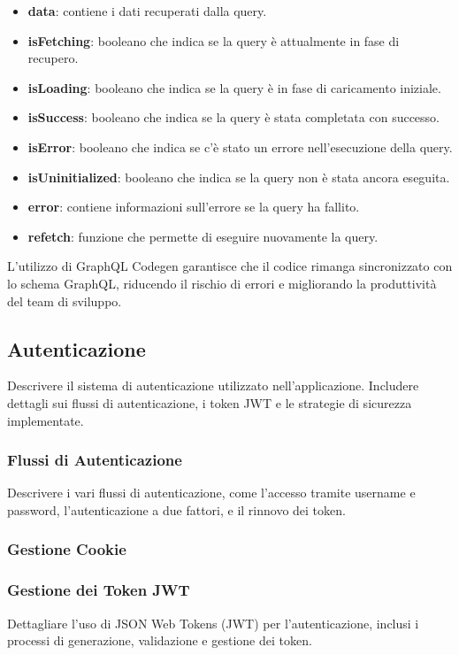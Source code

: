 \begin{itemize}
  \item \textbf{data}: contiene i dati recuperati dalla query.
  \item \textbf{isFetching}: booleano che indica se la query è attualmente in fase di recupero.
  \item \textbf{isLoading}: booleano che indica se la query è in fase di caricamento iniziale.
  \item \textbf{isSuccess}: booleano che indica se la query è stata completata con successo.
  \item \textbf{isError}: booleano che indica se c'è stato un errore nell'esecuzione della query.
  \item \textbf{isUninitialized}: booleano che indica se la query non è stata ancora eseguita.
  \item \textbf{error}: contiene informazioni sull'errore se la query ha fallito.
  \item \textbf{refetch}: funzione che permette di eseguire nuovamente la query.
\end{itemize}

L'utilizzo di GraphQL Codegen garantisce che il codice rimanga sincronizzato con lo schema GraphQL, 
riducendo il rischio di errori e migliorando la produttività del team di sviluppo.





\subsection{Autenticazione}
\label{subsec:autenticazione}

Descrivere il sistema di autenticazione utilizzato nell'applicazione. Includere dettagli sui flussi di autenticazione, i token JWT e le strategie di sicurezza implementate.

\subsubsection*{Flussi di Autenticazione}
Descrivere i vari flussi di autenticazione, come l'accesso tramite username e password, l'autenticazione a due fattori, e il rinnovo dei token.

\subsubsection*{Gestione Cookie}

\subsubsection*{Gestione dei Token JWT}
Dettagliare l'uso di JSON Web Tokens (JWT) per l'autenticazione, inclusi i processi di generazione, validazione e gestione dei token.

